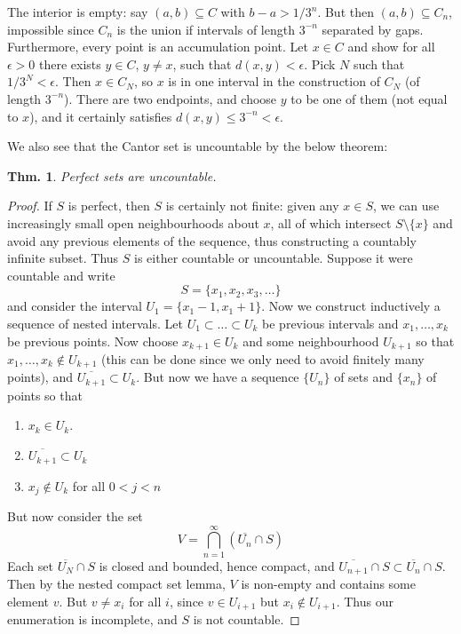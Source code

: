 \documentclass[12pt, a4paper]{book}
\newtheorem{theorem}{Thm.}[section]
\theoremstyle{nonumberplain}
\newtheorem{proof}{Proof}
\begin{document}
The interior is empty: say $(a,b)\subseteq C$ with $b-a>1/3^n$. But then $(a,b)\subseteq C_n$, impossible since $C_n$ is the
union if intervals of length $3^{-n}$ separated by gaps. Furthermore, every point is an accumulation point. Let $x\in C$ and
show for all $\epsilon>0$ there exists $y\in C$, $y\neq x$, such that $d(x,y)<\epsilon$. Pick $N$ such that $1/3^N<\epsilon$.
Then $x\in C_N$, so $x$ is in one interval in the construction of $C_N$ (of length $3^{-n}$). There are two endpoints,
and choose $y$ to be one of them (not equal to $x$), and it certainly satisfies $d(x,y)\leq 3^{-n}<\epsilon$.
\begin{center}
\end{center}
We also see that the Cantor set is uncountable by the below theorem:
\begin{theorem}
    Perfect sets are uncountable.
\end{theorem}
\begin{proof}
    If $S$ is perfect, then $S$ is certainly not finite: given any $x\in S$, we can use increasingly small open
    neighbourhoods about $x$, all of which intersect $S\setminus\{x\}$ and avoid any previous elements of the sequence,
    thus constructing a countably infinite subset. Thus $S$ is either countable or uncountable. Suppose it were countable
    and write
    \[S=\{x_1,x_2,x_3,\ldots\}\]
    and consider the interval $U_1=\{x_1-1,x_1+1\}$. Now we construct inductively a sequence of nested intervals. Let
    $U_1\subset\ldots\subset U_k$ be previous intervals and $x_1,\ldots,x_k$ be previous points. Now choose $x_{k+1}\in U_k$
    and some neighbourhood $U_{k+1}$ so that $x_1,\ldots,x_k\notin U_{k+1}$ (this can be done since we only need to
    avoid finitely many points), and $\overline{U_{k+1}}\subset U_k$. But now we have a sequence $\{U_n\}$ of sets
    and $\{x_n\}$ of points so that
    \begin{enumerate}
        \item $x_k\in U_k$.
        \item $\overline{U_{k+1}}\subset U_k$
        \item $x_j\notin U_k$ for all $0<j<n$
    \end{enumerate}
    But now consider the set
    \[V=\bigcap_{n=1}^\infty \left( \overline{U_n}\cap S \right)\]
    Each set $\overline{U_N}\cap S$ is closed and bounded, hence compact, and $\overline{U_{n+1}}\cap S\subset\overline{U_{n}}\cap S$.
    Then by the nested compact set lemma, $V$ is non-empty and contains some element $v$. But $v\neq x_i$ for all $i$,
    since $v\in U_{i+1}$ but $x_i\notin U_{i+1}$. Thus our enumeration is incomplete, and $S$ is not countable.
\end{proof}
\end{document}

